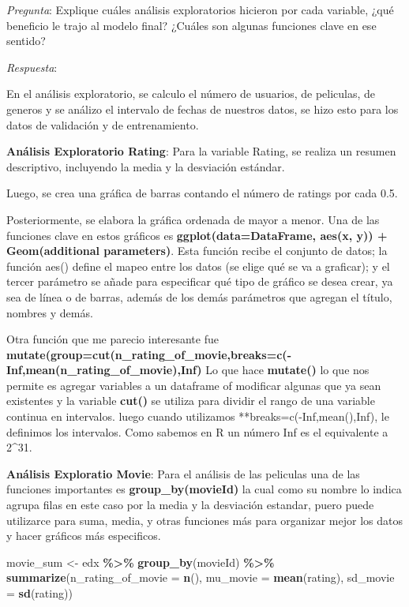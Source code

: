 \documentclass[
]{article}
\newenvironment{Shaded}{\begin{snugshade}}{\end{snugshade}}
\newcommand{\AttributeTok}[1]{\textcolor[rgb]{0.13,0.29,0.53}{#1}}
\newcommand{\FunctionTok}[1]{\textcolor[rgb]{0.13,0.29,0.53}{\textbf{#1}}}
\newcommand{\NormalTok}[1]{#1}
\newcommand{\OtherTok}[1]{\textcolor[rgb]{0.56,0.35,0.01}{#1}}
\newcommand{\SpecialCharTok}[1]{\textcolor[rgb]{0.81,0.36,0.00}{\textbf{#1}}}
\begin{document}
\emph{Pregunta}: Explique cuáles análisis exploratorios hicieron por
cada variable, ¿qué beneficio le trajo al modelo final? ¿Cuáles son
algunas funciones clave en ese sentido?

\emph{Respuesta}:

En el análisis exploratorio, se calculo el número de usuarios, de
peliculas, de generos y se análizo el intervalo de fechas de nuestros
datos, se hizo esto para los datos de validación y de entrenamiento.

\textbf{Análisis Exploratorio Rating}: Para la variable Rating, se
realiza un resumen descriptivo, incluyendo la media y la desviación
estándar.

Luego, se crea una gráfica de barras contando el número de ratings por
cada 0.5.

Posteriormente, se elabora la gráfica ordenada de mayor a menor. Una de
las funciones clave en estos gráficos es \textbf{ggplot(data=DataFrame,
aes(x, y)) + Geom(additional parameters)}. Esta función recibe el
conjunto de datos; la función aes() define el mapeo entre los datos (se
elige qué se va a graficar); y el tercer parámetro se añade para
especificar qué tipo de gráfico se desea crear, ya sea de línea o de
barras, además de los demás parámetros que agregan el título, nombres y
demás.

Otra función que me parecio interesante fue
\textbf{mutate(group=cut(n\_rating\_of\_movie,breaks=c(-Inf,mean(n\_rating\_of\_movie),Inf)}
Lo que hace \textbf{mutate()} lo que nos permite es agregar variables a
un dataframe of modificar algunas que ya sean existentes y la variable
\textbf{cut()} se utiliza para dividir el rango de una variable continua
en intervalos. luego cuando utilizamos **breaks=c(-Inf,mean(),Inf), le
definimos los intervalos. Como sabemos en R un número Inf es el
equivalente a 2\^{}31.

\textbf{Análisis Exploratio Movie}: Para el análisis de las peliculas
una de las funciones importantes es \textbf{group\_by(movieId)} la cual
como su nombre lo indica agrupa filas en este caso por la media y la
desviación estandar, puero puede utilizarce para suma, media, y otras
funciones más para organizar mejor los datos y hacer gráficos más
especificos.

\begin{Shaded}
\begin{Highlighting}[]
\NormalTok{movie\_sum }\OtherTok{\textless{}{-}}\NormalTok{ edx }\SpecialCharTok{\%\textgreater{}\%} \FunctionTok{group\_by}\NormalTok{(movieId) }\SpecialCharTok{\%\textgreater{}\%}
  \FunctionTok{summarize}\NormalTok{(}\AttributeTok{n\_rating\_of\_movie =} \FunctionTok{n}\NormalTok{(), }
            \AttributeTok{mu\_movie =} \FunctionTok{mean}\NormalTok{(rating),}
            \AttributeTok{sd\_movie =} \FunctionTok{sd}\NormalTok{(rating))}
\end{Highlighting}
\end{Shaded}
\end{document}
